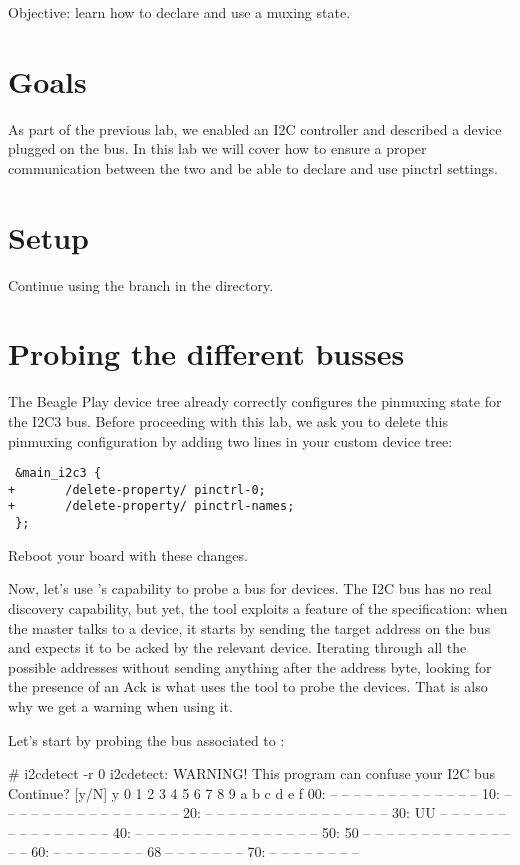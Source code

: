 {Objective: learn how to declare and use a muxing state.}

\section{Goals}

As part of the previous lab, we enabled an I2C controller and described
a device plugged on the bus. In this lab we will cover how to ensure a
proper communication between the two and be able to declare and use
pinctrl settings.

\section{Setup}

Continue using the  branch in the
 directory.

\section{Probing the different busses}

The Beagle Play device tree already correctly configures the pinmuxing state
for the I2C3 bus. Before proceeding with this lab, we ask you to delete this
pinmuxing configuration by adding two lines in your custom device tree:

\begin{verbatim}
 &main_i2c3 {
+       /delete-property/ pinctrl-0;
+       /delete-property/ pinctrl-names;
 };
\end{verbatim}

Reboot your board with these changes.

Now, let's use 's capability to probe a bus for
devices. The I2C bus has no real discovery capability, but yet, the tool
exploits a feature of the specification: when the master talks to a
device, it starts by sending the target address on the bus and expects
it to be acked by the relevant device. Iterating through all the
possible addresses without sending anything after the address byte,
looking for the presence of an Ack is what uses the tool to probe the
devices. That is also why we get a warning when using it.

Let's start by probing the bus associated to :

\begin{bashinput}
# i2cdetect -r 0
i2cdetect: WARNING! This program can confuse your I2C bus
Continue? [y/N] y
     0  1  2  3  4  5  6  7  8  9  a  b  c  d  e  f
00:          -- -- -- -- -- -- -- -- -- -- -- -- -- 
10: -- -- -- -- -- -- -- -- -- -- -- -- -- -- -- -- 
20: -- -- -- -- -- -- -- -- -- -- -- -- -- -- -- -- 
30: UU -- -- -- -- -- -- -- -- -- -- -- -- -- -- -- 
40: -- -- -- -- -- -- -- -- -- -- -- -- -- -- -- -- 
50: 50 -- -- -- -- -- -- -- -- -- -- -- -- -- -- -- 
60: -- -- -- -- -- -- -- -- 68 -- -- -- -- -- -- -- 
70: -- -- -- -- -- -- -- -- 
\end{bashinput}

